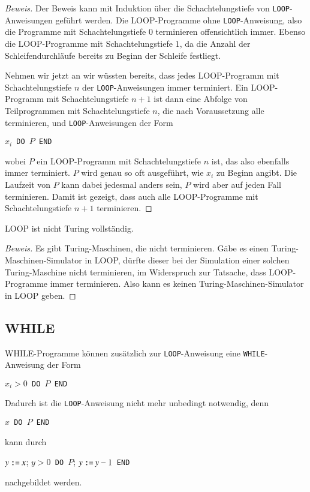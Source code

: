 \begin{proof}[Beweis]
Der Beweis kann mit Induktion über die Schachtelungstiefe
von {\tt LOOP}-Anweisungen geführt werden. Die LOOP-Programme
ohne {\tt LOOP}-Anweisung, also die Programme mit Schachtelungstiefe
$0$ terminieren offensichtlich immer. Ebenso die LOOP-Programme
mit Schachtelungstiefe $1$, da die Anzahl der Schleifendurchläufe
bereits zu Beginn der Schleife festliegt.

Nehmen wir jetzt an wir wüssten bereits, dass jedes LOOP-Programm mit
Schachtelungstiefe $n$ der {\tt LOOP}-Anweisungen immer terminiert.
Ein LOOP-Programm mit Schachtelungstiefe $n+1$ ist dann eine
Abfolge von Teilprogrammen mit Schachtelungstiefe $n$, die nach
Voraussetzung alle terminieren, und {\tt LOOP}-Anweisungen der
Form
\begin{algorithmic}
$x_i${\tt\ DO }$P${\tt\ END}
\end{algorithmic}
wobei $P$ ein LOOP-Programm mit Schachtelungstiefe $n$ ist, das also
ebenfalls immer terminiert. $P$ wird genau so oft ausgeführt, wie
$x_i$ zu Beginn angibt. Die Laufzeit von $P$ kann dabei jedesmal
anders sein, $P$ wird aber auf jeden Fall terminieren. Damit ist
gezeigt, dass auch alle LOOP-Programme mit Schachtelungstiefe $n+1$
terminieren.
\end{proof}

\begin{satz}
LOOP ist nicht Turing vollständig.
\end{satz}

\begin{proof}[Beweis]
Es gibt Turing-Maschinen, die nicht terminieren. Gäbe es einen
Turing-Maschinen-Simulator in LOOP, dürfte dieser bei der
Simulation einer solchen Turing-Maschine nicht terminieren, im
Widerspruch zur Tatsache, dass LOOP-Programme immer terminieren.
Also kann es keinen Turing-Maschinen-Simulator in LOOP geben.
\end{proof}

\subsection{WHILE}
%
WHILE-Programme können zusätzlich zur {\tt LOOP}-Anweisung
eine {\tt WHILE}-Anweisung der Form
\begin{algorithmic}
$x_i>0${\tt\ DO }$P${\tt\ END}
\end{algorithmic}
Dadurch ist die {\tt LOOP}-Anweisung nicht mehr unbedingt
notwendig, denn
\begin{algorithmic}
$x${\tt\ DO }$P${\tt\ END}
\end{algorithmic}
kann durch
\begin{algorithmic}
\STATE$y \mathbin{\texttt{:=}} x$;
$y>0${\tt\ DO }$P$; $y \mathbin{\texttt{:=}} y-1${\tt\ END}
\end{algorithmic}
nachgebildet werden.

